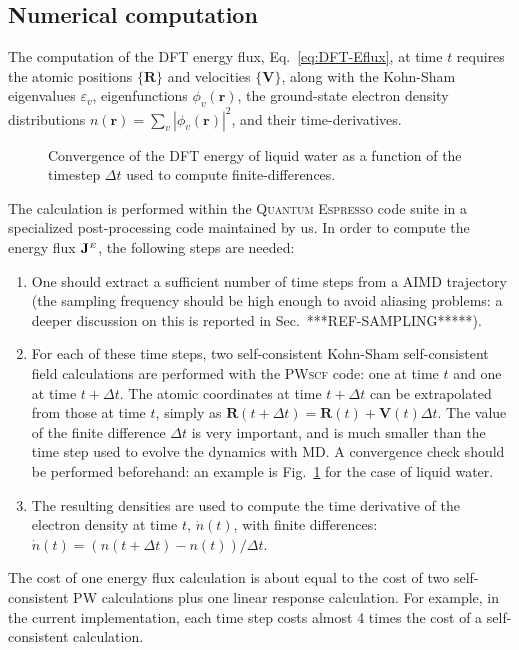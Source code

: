 \subsection{Numerical computation}
\begin{LEtext}
The computation of the DFT energy flux, Eq.~\eqref{eq:DFT-Eflux}, at time $t$ requires the atomic positions $\{\mathbf{R}\}$ and velocities $\{\mathbf{V}\}$, along with the Kohn-Sham eigenvalues $\varepsilon_v$, eigenfunctions $\phi_v(\mathbf{r})$, the ground-state electron density distributions $n(\mathbf{r}) = \sum_v |\phi_v(\mathbf{r})|^2$, and their time-derivatives. 

\begin{figure}
    \centering
    \caption{Convergence of the DFT energy of liquid water as a function of the timestep $\Delta t$ used to compute finite-differences.}
    \label{fig:dft-curr-timestep-water}
\end{figure}
The calculation is performed within the \textsc{Quantum Espresso} code suite \cite{Giannozzi2009,Giannozzi2017} in a specialized post-processing code maintained by us. 
In order to compute the energy flux $\mathbf{J}^{\scriptscriptstyle E}$, the following steps are needed: 
\begin{enumerate}
    \item One should extract a sufficient number of time steps from a AIMD trajectory (the sampling frequency should be high enough to avoid aliasing problems: a deeper discussion on this is reported in Sec.~***REF-SAMPLING*****). 
    \item For each of these time steps, two self-consistent Kohn-Sham self-consistent field calculations are performed with the \textsc{PWscf} code: one at time $t$ and one at time $t+\Delta t$. The atomic coordinates at time $t+\Delta t$ can be extrapolated from those at time $t$, simply as $\mathbf{R}(t+\Delta t) = \mathbf{R}(t) + \mathbf{V}(t) \Delta t$. The value of the finite difference $\Delta t$ is very important, and is much smaller than the time step used to evolve the dynamics with MD. A convergence check should be performed beforehand: an example is Fig.~\ref{fig:dft-curr-timestep-water} for the case of liquid water.
    \item The resulting densities are used to compute the time derivative of the electron density at time $t$, $\dot{n}(t)$, with finite differences: $\dot{n}(t) = (n(t+\Delta t) - n(t))/\Delta t$.
\end{enumerate}
The cost of one energy flux calculation is about equal to the cost of two self-consistent \textsc{PW} calculations plus one linear response calculation. For example, in the current implementation, each time step costs almost 4 times the cost of a self-consistent calculation.

\end{LEtext}

